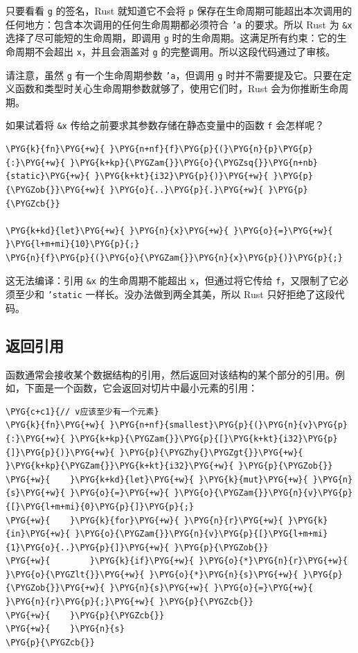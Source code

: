 只要看看 \texttt{g} 的签名，Rust 就知道它不会将 \texttt{p} 保存在生命周期可能超出本次调用的任何地方：包含本次调用的任何生命周期都必须符合 \texttt{'a} 的要求。所以 Rust 为 \texttt{\&x} 选择了尽可能短的生命周期，即调用 \texttt{g} 时的生命周期。这满足所有约束：它的生命周期不会超出 \texttt{x}，并且会涵盖对 \texttt{g} 的完整调用。所以这段代码通过了审核。

请注意，虽然 \texttt{g} 有一个生命周期参数 \texttt{'a}，但调用 \texttt{g} 时并不需要提及它。只要在定义函数和类型时关心生命周期参数就够了，使用它们时，Rust 会为你推断生命周期。

如果试着将 \texttt{\&x} 传给之前要求其参数存储在静态变量中的函数 \texttt{f} 会怎样呢？

\begin{Verbatim}[commandchars=\\\{\},breaklines=true,breakanywhere=true,fontsize=\codefont,xleftmargin=17bp]
\PYG{k}{fn}\PYG{+w}{ }\PYG{n+nf}{f}\PYG{p}{(}\PYG{n}{p}\PYG{p}{:}\PYG{+w}{ }\PYG{k+kp}{\PYGZam{}}\PYG{o}{\PYGZsq{}}\PYG{n+nb}{static}\PYG{+w}{ }\PYG{k+kt}{i32}\PYG{p}{)}\PYG{+w}{ }\PYG{p}{\PYGZob{}}\PYG{+w}{ }\PYG{o}{..}\PYG{p}{.}\PYG{+w}{ }\PYG{p}{\PYGZcb{}}

\PYG{k+kd}{let}\PYG{+w}{ }\PYG{n}{x}\PYG{+w}{ }\PYG{o}{=}\PYG{+w}{ }\PYG{l+m+mi}{10}\PYG{p}{;}
\PYG{n}{f}\PYG{p}{(}\PYG{o}{\PYGZam{}}\PYG{n}{x}\PYG{p}{)}\PYG{p}{;}
\end{Verbatim}

这无法编译：引用 \texttt{\&x} 的生命周期不能超出 \texttt{x}，但通过将它传给 \texttt{f}，又限制了它必须至少和 \texttt{'static} 一样长。没办法做到两全其美，所以 Rust 只好拒绝了这段代码。

\subsection{返回引用}

函数通常会接收某个数据结构的引用，然后返回对该结构的某个部分的引用。例如，下面是一个函数，它会返回对切片中最小元素的引用：

\begin{Verbatim}[commandchars=\\\{\},breaklines=true,breakanywhere=true,fontsize=\codefont,xleftmargin=17bp]
\PYG{c+c1}{// v应该至少有一个元素}
\PYG{k}{fn}\PYG{+w}{ }\PYG{n+nf}{smallest}\PYG{p}{(}\PYG{n}{v}\PYG{p}{:}\PYG{+w}{ }\PYG{k+kp}{\PYGZam{}}\PYG{p}{[}\PYG{k+kt}{i32}\PYG{p}{]}\PYG{p}{)}\PYG{+w}{ }\PYG{p}{\PYGZhy{}\PYGZgt{}}\PYG{+w}{ }\PYG{k+kp}{\PYGZam{}}\PYG{k+kt}{i32}\PYG{+w}{ }\PYG{p}{\PYGZob{}}
\PYG{+w}{    }\PYG{k+kd}{let}\PYG{+w}{ }\PYG{k}{mut}\PYG{+w}{ }\PYG{n}{s}\PYG{+w}{ }\PYG{o}{=}\PYG{+w}{ }\PYG{o}{\PYGZam{}}\PYG{n}{v}\PYG{p}{[}\PYG{l+m+mi}{0}\PYG{p}{]}\PYG{p}{;}
\PYG{+w}{    }\PYG{k}{for}\PYG{+w}{ }\PYG{n}{r}\PYG{+w}{ }\PYG{k}{in}\PYG{+w}{ }\PYG{o}{\PYGZam{}}\PYG{n}{v}\PYG{p}{[}\PYG{l+m+mi}{1}\PYG{o}{..}\PYG{p}{]}\PYG{+w}{ }\PYG{p}{\PYGZob{}}
\PYG{+w}{        }\PYG{k}{if}\PYG{+w}{ }\PYG{o}{*}\PYG{n}{r}\PYG{+w}{ }\PYG{o}{\PYGZlt{}}\PYG{+w}{ }\PYG{o}{*}\PYG{n}{s}\PYG{+w}{ }\PYG{p}{\PYGZob{}}\PYG{+w}{ }\PYG{n}{s}\PYG{+w}{ }\PYG{o}{=}\PYG{+w}{ }\PYG{n}{r}\PYG{p}{;}\PYG{+w}{ }\PYG{p}{\PYGZcb{}}
\PYG{+w}{    }\PYG{p}{\PYGZcb{}}
\PYG{+w}{    }\PYG{n}{s}
\PYG{p}{\PYGZcb{}}
\end{Verbatim}

